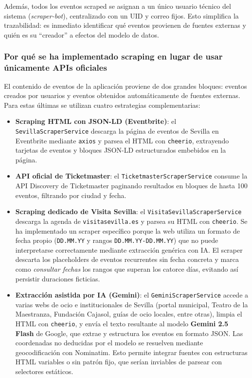 Además, todos los eventos scraped se asignan a un único usuario técnico del sistema (\textit{scraper-bot}), centralizado con un UID y correo fijos. Esto simplifica la trazabilidad: es inmediato identificar qué eventos provienen de fuentes externas y quién es su ``creador'' a efectos del modelo de datos.

\subsubsection{Por qué se ha implementado scraping en lugar de usar únicamente APIs oficiales}

El contenido de eventos de la aplicación proviene de dos grandes bloques: eventos creados por usuarios y eventos obtenidos automáticamente de fuentes externas. Para estas últimas se utilizan cuatro estrategias complementarias:

\begin{itemize}
    \item \textbf{Scraping HTML con JSON-LD (Eventbrite)}: el \texttt{SevillaScraperService} descarga la página de eventos de Sevilla en Eventbrite mediante \texttt{axios} y parsea el HTML con \texttt{cheerio}, extrayendo tarjetas de eventos y bloques JSON-LD estructurados embebidos en la página.
    \item \textbf{API oficial de Ticketmaster}: el \texttt{TicketmasterScraperService} consume la API Discovery de Ticketmaster paginando resultados en bloques de hasta 100 eventos, filtrando por ciudad y fecha.
    \item \textbf{Scraping dedicado de Visita Sevilla}: el \texttt{VisitaSevillaScraperService} descarga la agenda de \texttt{visitasevilla.es} y parsea su HTML con \texttt{cheerio}. Se ha implementado un scraper específico porque la web utiliza un formato de fecha propio (\texttt{DD.MM.YY} y rangos \texttt{DD.MM.YY-DD.MM.YY}) que no puede interpretarse correctamente mediante extracción genérica con IA. El scraper descarta los placeholders de eventos recurrentes sin fecha concreta y marca como \textit{consultar fechas} los rangos que superan los catorce días, evitando así persistir duraciones ficticias.
    \item \textbf{Extracción asistida por IA (Gemini)}: el \texttt{GeminiScraperService} accede a varias webs de ocio e institucionales de Sevilla (portal municipal, Teatro de la Maestranza, Fundación Cajasol, guías de ocio locales, entre otras), limpia el HTML con \texttt{cheerio}, y envía el texto resultante al modelo \textbf{Gemini 2.5 Flash} de Google, que extrae y estructura los eventos en formato JSON. Las coordenadas no deducidas por el modelo se resuelven mediante geocodificación con Nominatim. Esto permite integrar fuentes con estructuras HTML variables o sin patrón fijo, que serían inviables de parsear con selectores estáticos.
\end{itemize}

